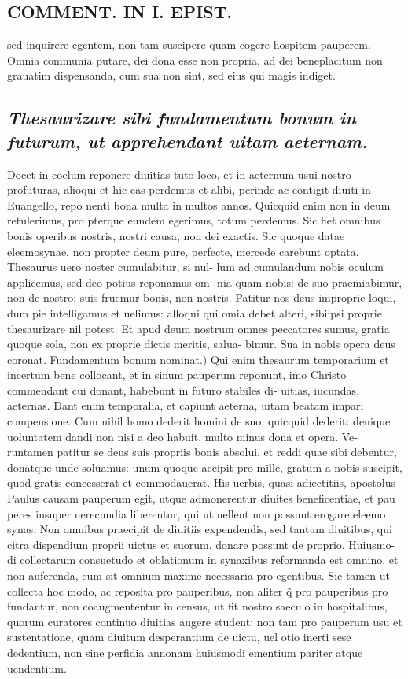 \documentclass{article}
\begin{document}
\begin{pages}
\section*{COMMENT. IN I. EPIST. }
\marginpar{[ p.542 ]}\pstart sed inquirere egentem, non tam suscipere quam cogere hospitem pauperem. Omnia communia putare, dei dona esse non propria, ad dei beneplacitum non grauatim dispensanda, cum sua non sint, sed eius qui magis indiget.  \pend
{}
{}
\subsection*{\textit{Thesaurizare sibi fundamentum bonum in futurum, ut apprehendant uitam aeternam. }}\pstart Docet in coelum reponere diuitias tuto loco, et in aeternum usui nostro profuturas, alioqui et hic eas perdemus et alibi, perinde ac contigit diuiti in Euangello, repo nenti bona multa in multos annos. Quicquid enim non in deum retulerimus, pro pterque eundem egerimus, totum perdemus. Sic fiet omnibus bonis operibus nostris, nostri causa, non dei exactis. Sic quoque datae eleemosynae, non propter deum pure, perfecte, mercede carebunt optata. Thesaurus uero noster cumulabitur, si nul- lum ad cumulandum nobis oculum applicemus, sed deo potius reponamus om- nia quam nobis: de suo praemiabimur, non de nostro: suis fruemur bonis, non nostris. Patitur nos deus improprie loqui, dum pie intelligamus et uelimus: alloqui qui omia debet alteri, sibiipsi proprie thesaurizare nil potest. Et apud deum nostrum omnes peccatores sumus, gratia quoque sola, non ex proprie dictis meritis, salua- bimur. Sua in nobis opera deus coronat. Fundamentum bonum nominat.) Qui enim thesaurum temporarium et incertum bene collocant, et in sinum pauperum reponunt, imo Christo commendant cui donant, habebunt in futuro stabiles di- uitias, iucundas, aeternas. Dant enim temporalia, et capiunt aeterna, uitam beatam impari compensione. Cum nihil homo dederit homini de suo, quicquid dederit: denique uoluntatem dandi non nisi a deo habuit, multo minus dona et opera. Ve- runtamen patitur se deus suis propriis bonis absolui, et reddi quae sibi debentur, donatque unde soluamus: unum quoque accipit pro mille, gratum a nobis suscipit, quod gratis concesserat et commodauerat. His uerbis, quasi adiectitiis, apostolus Paulus causam pauperum egit, utque admonerentur diuites beneficentiae, et pau peres insuper uerecundia liberentur, qui ut uellent non possunt erogare eleemo synas. Non omnibus praecipit de diuitiis expendendis, sed tantum diuitibus, qui citra dispendium proprii uictus et suorum, donare possunt de proprio. Huiusmo- di collectarum consuetudo et oblationum in synaxibus reformanda est omnino, et non auferenda, cum sit omnium maxime necessaria pro egentibus. Sic tamen ut collecta hoc modo, ac reposita pro pauperibus, non aliter q̃ pro pauperibus pro fundantur, non coaugmententur in census, ut fit nostro saeculo in hospitalibus, quorum curatores continuo diuitias augere student: non tam pro pauperum usu et sustentatione, quam diuitum desperantium de uictu, uel otio inerti sese dedentium, non sine perfidia annonam huiusmodi ementium pariter atque uendentium.  \pend

\end{pages}
\end{document}
